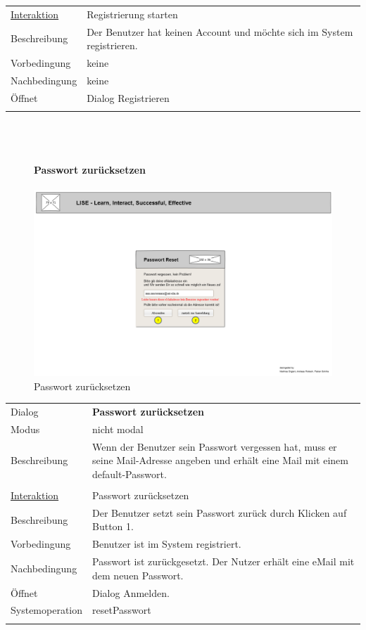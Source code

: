 \documentclass[12pt,a4paper]{article}
\begin{document}
{\begin{tabular}{l p{12cm}}
	\underline{Interaktion} 	 & Registrierung starten\\ 
	Beschreibung   	& Der Benutzer hat keinen Account und möchte sich im System registrieren.\\
	Vorbedingung	& keine\\
	Nachbedingung	& keine \\
	Öffnet			& Dialog \glqq Registrieren\grqq\\\\
\end{tabular}\\\\

\begin{figure}[H]
	\centering
	\paragraph{Passwort zurücksetzen}
	\includegraphics[width=\textwidth]{Bilder/Mockups/GUI/PasswortVergessen.png}
	\caption{Passwort zurücksetzen}
	\label{GuiPasswortVergessen}
\end{figure}
\begin{tabular}{l p{12cm}}
	Dialog 	 & \textbf{Passwort zurücksetzen} \\ 
	Modus & nicht modal\\ 
	Beschreibung   	& Wenn der Benutzer sein Passwort vergessen hat, muss er seine Mail-Adresse angeben und erhält eine Mail mit einem default-Passwort. \\\\
	
	\underline{Interaktion} 	 & Passwort zurücksetzen\\ 
	Beschreibung   	& Der Benutzer setzt sein Passwort zurück durch Klicken auf Button 1.\\
	Vorbedingung	& Benutzer ist im System registriert.\\
	Nachbedingung	& Passwort ist zurückgesetzt. Der Nutzer erhält eine eMail mit dem neuen Passwort. \\
	Öffnet			& Dialog \glqq Anmelden\grqq.\\
	Systemoperation & resetPasswort\\\\
\end{tabular}

}
\end{document}
